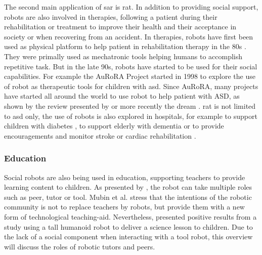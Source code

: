 	The second main application of \gls{sar} is \gls{rat}. In addition to providing social support, robots are also involved in therapies, following a patient during their rehabilitation or treatment to improve their health and their acceptance in society or when recovering from an accident. In therapies, robots have first been used as physical platform to help patient in rehabilitation therapy in the 80s \citep{harwin1988robot}. They were primally used as mechatronic tools helping humans to accomplish repetitive task. But in the late 90s, robots have started to be used for their social capabilities. For example the AuRoRA Project \citep{dautenhahn1999robots} started in 1998 to explore the use of robot as therapeutic tools for children with \gls{asd}. Since AuRoRA, many projects have started all around the world to use robot to help patient with ASD, as shown by the review presented by \cite{diehl2012clinical} or more recently the \gls{dream} \citep{esteban2017build}. \gls{rat} is not limited to \gls{asd} only, the use of robots is also explored in hospitals, for example to support children with diabetes \citep{belpaeme2012multimodal}, to support elderly with dementia \citep{wada2005psychological} or to provide encouragements and monitor stroke \citep{mataric2007socially} or cardiac rehabilitation \citep{lara2017human}.	
	
\subsubsection{Education} 
	Social robots are also being used in education, supporting teachers to provide learning content to children. As presented by \cite{mubin2013review}, the robot can take multiple roles such as peer, tutor or tool. Mubin et al. stress that the intentions of the robotic community is not to replace teachers by robots, but provide them with a new form of technological teaching-aid. Nevertheless, \cite{verner2016science} presented positive results from a study using a tall humanoid robot to deliver a science lesson to children. Due to the lack of a social component when interacting with a tool robot, this overview will discuss the roles of robotic tutors and peers.
		
